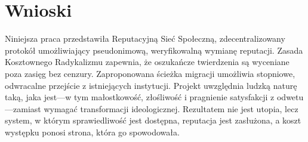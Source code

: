 \documentclass[11pt,a4paper,twocolumn]{article}
\begin{document}
\section{Wnioski}

Niniejsza praca przedstawiła Reputacyjną Sieć Społeczną, zdecentralizowany protokół umożliwiający pseudonimową, weryfikowalną wymianę reputacji. Zasada Kosztownego Radykalizmu zapewnia, że oszukańcze twierdzenia są wyceniane poza zasięg bez cenzury. Zaproponowana ścieżka migracji umożliwia stopniowe, odwracalne przejście z istniejących instytucji. Projekt uwzględnia ludzką naturę taką, jaka jest---w tym małostkowość, złośliwość i pragnienie satysfakcji z odwetu---zamiast wymagać transformacji ideologicznej. Rezultatem nie jest utopia, lecz system, w którym sprawiedliwość jest dostępna, reputacja jest zasłużona, a koszt występku ponosi strona, która go spowodowała.


\end{document}
